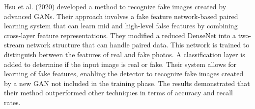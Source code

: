 Hsu et al. (2020) \cite{hung2021multi} developed a method to recognize fake images created by advanced GANs. Their approach involves a fake feature network-based paired learning system that can learn mid and high-level false features by combining cross-layer feature representations. They modified a reduced DenseNet into a two-stream network structure that can handle paired data. This network is trained to distinguish between the features of real and fake photos. A classification layer is added to determine if the input image is real or fake. Their system allows for learning of fake features, enabling the detector to recognize fake images created by a new GAN not included in the training phase. The results demonstrated that their method outperformed other techniques in terms of accuracy and recall rates.

 

